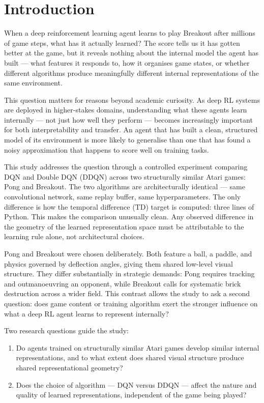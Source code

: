 \section{Introduction}

When a deep reinforcement learning agent learns to play Breakout after millions of game steps, what has it actually learned? The score tells us it has gotten better at the game, but it reveals nothing about the internal model the agent has built --- what features it responds to, how it organises game states, or whether different algorithms produce meaningfully different internal representations of the same environment.

This question matters for reasons beyond academic curiosity. As deep RL systems are deployed in higher-stakes domains, understanding what these agents learn internally --- not just how well they perform --- becomes increasingly important for both interpretability and transfer. An agent that has built a clean, structured model of its environment is more likely to generalise than one that has found a noisy approximation that happens to score well on training tasks.

This study addresses the question through a controlled experiment comparing DQN \cite{mnih2015human} and Double DQN (DDQN) \cite{van2016deep} across two structurally similar Atari games: Pong and Breakout. The two algorithms are architecturally identical --- same convolutional network, same replay buffer, same hyperparameters. The only difference is how the temporal difference (TD) target is computed: three lines of Python. This makes the comparison unusually clean. Any observed difference in the geometry of the learned representation space must be attributable to the learning rule alone, not architectural choices.

Pong and Breakout were chosen deliberately. Both feature a ball, a paddle, and physics governed by deflection angles, giving them shared low-level visual structure. They differ substantially in strategic demands: Pong requires tracking and outmanoeuvring an opponent, while Breakout calls for systematic brick destruction across a wider field. This contrast allows the study to ask a second question: does game content or training algorithm exert the stronger influence on what a deep RL agent learns to represent internally?

Two research questions guide the study:

\begin{enumerate}
    \item Do agents trained on structurally similar Atari games develop similar internal representations, and to what extent does shared visual structure produce shared representational geometry?
    \item Does the choice of algorithm --- DQN versus DDQN --- affect the nature and quality of learned representations, independent of the game being played?
\end{enumerate}

